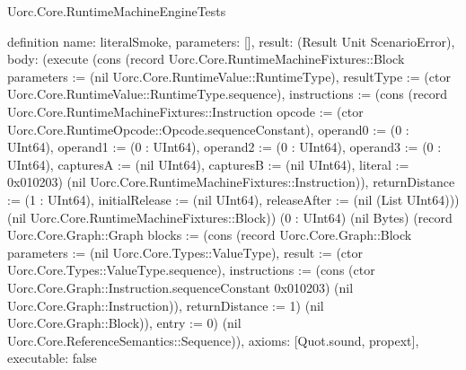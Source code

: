 \begin{lexlean}{Uorc.Core.RuntimeMachineEngineTests}
\begin{semanticmodule}
definition{
  name: literalSmoke,
  parameters: [],
  result: (Result Unit ScenarioError),
  body: (execute (cons (record Uorc.Core.RuntimeMachineFixtures::Block {parameters := (nil Uorc.Core.RuntimeValue::RuntimeType), resultType := (ctor Uorc.Core.RuntimeValue::RuntimeType.sequence), instructions := (cons (record Uorc.Core.RuntimeMachineFixtures::Instruction {opcode := (ctor Uorc.Core.RuntimeOpcode::Opcode.sequenceConstant), operand0 := (0 : UInt64), operand1 := (0 : UInt64), operand2 := (0 : UInt64), operand3 := (0 : UInt64), capturesA := (nil UInt64), capturesB := (nil UInt64), literal := 0x010203}) (nil Uorc.Core.RuntimeMachineFixtures::Instruction)), returnDistance := (1 : UInt64), initialRelease := (nil UInt64), releaseAfter := (nil (List UInt64))}) (nil Uorc.Core.RuntimeMachineFixtures::Block)) (0 : UInt64) (nil Bytes) (record Uorc.Core.Graph::Graph {blocks := (cons (record Uorc.Core.Graph::Block {parameters := (nil Uorc.Core.Types::ValueType), result := (ctor Uorc.Core.Types::ValueType.sequence), instructions := (cons (ctor Uorc.Core.Graph::Instruction.sequenceConstant 0x010203) (nil Uorc.Core.Graph::Instruction)), returnDistance := 1}) (nil Uorc.Core.Graph::Block)), entry := 0}) (nil Uorc.Core.ReferenceSemantics::Sequence)),
  axioms: [Quot.sound, propext],
  executable: false
}


\end{semanticmodule}
\end{lexlean}

